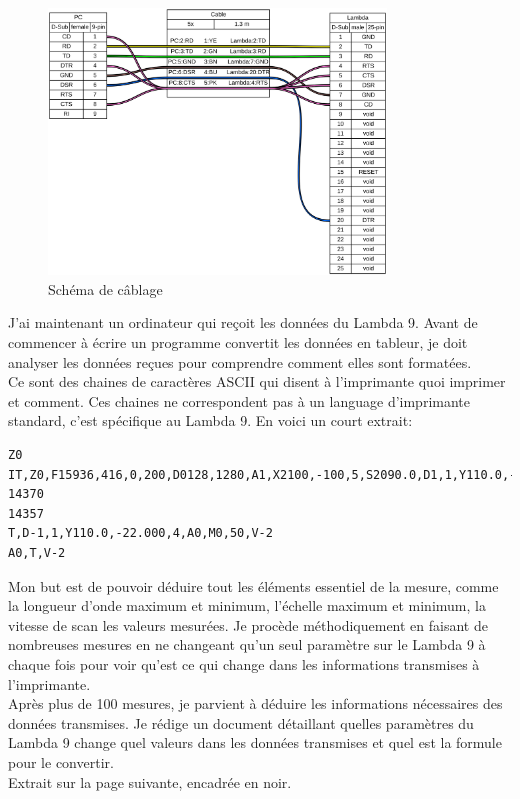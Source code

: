\documentclass[12pt]{article}
\begin{document}
\begin{figure}[h]
	\centering
	\includegraphics[width=0.8\textwidth]{cableLambda}
	\caption{Schéma de câblage}
	\label{fig:schemaCable}
\end{figure}


\FloatBarrier
J'ai maintenant un ordinateur qui reçoit les données du Lambda 9.
Avant de commencer à écrire un programme convertit les données en tableur, je doit analyser les données reçues pour comprendre comment elles sont formatées.\\
Ce sont des chaines de caractères ASCII qui disent à l'imprimante quoi imprimer et comment.
Ces chaines ne correspondent pas à un language d'imprimante standard, c'est spécifique au Lambda 9.
En voici un court extrait:
\begin{lstlisting}
Z0
IT,Z0,F15936,416,0,200,D0128,1280,A1,X2100,-100,5,S2090.0,D1,1,Y110.0,-22.000,4,Z0,D0128,1280,L1
14370
14357
T,D-1,1,Y110.0,-22.000,4,A0,M0,50,V-2
A0,T,V-2
\end{lstlisting}
Mon but est de pouvoir déduire tout les éléments essentiel de la mesure, comme la longueur d'onde maximum et minimum, l'échelle maximum et minimum, la vitesse de scan les valeurs mesurées.
Je procède méthodiquement en faisant de nombreuses mesures en ne changeant qu'un seul paramètre sur le Lambda 9 à chaque fois pour voir qu'est ce qui change dans les informations transmises à l'imprimante.\\
Après plus de 100 mesures, je parvient à déduire les informations nécessaires des données transmises.
Je rédige un document détaillant quelles paramètres du Lambda 9 change quel valeurs dans les données transmises et quel est la formule pour le convertir.\\
Extrait sur la page suivante, encadrée en noir.
\end{document}
